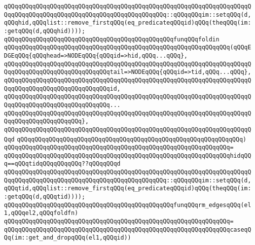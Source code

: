 \verb|qQQqqQQqqQQqqQQqqQQqqQQqqQQqqQQqqQQqqQQqqQQqqQQqqQQqqQQqqQQqqQQqqQQqqQQqqQQqqQQqqQQqqQQqqQQqqQQqqQQqqQQqqQQqqQQqqQQq::qQQqqQQqim::setqQQq(d,qQQqhid,qQQqlist::remove_firstqQQq(eq_predicateqQQqid)qQQq(theqQQq(im::getqQQq(d,qQQqhid))));|\newline
\newline
\newline
\verb|qQQqqQQqqQQqqQQqqQQqqQQqqQQqqQQqqQQqqQQqqQQqqQQqfunqQQqfoldin|\newline
\verb|qQQqqQQqqQQqqQQqqQQqqQQqqQQqqQQqqQQqqQQqqQQqqQQqqQQqqQQqqQQqqQQq(qQQqEDGEqQQq{qQQqhead=>NODEqQQq{qQQqid=>hid,qQQq...qQQq},|\newline
\verb|qQQqqQQqqQQqqQQqqQQqqQQqqQQqqQQqqQQqqQQqqQQqqQQqqQQqqQQqqQQqqQQqqQQqqQQqqQQqqQQqqQQqqQQqqQQqqQQqqQQqtail=>NODEqQQq{qQQqid=>tid,qQQq...qQQq},|\newline
\verb|qQQqqQQqqQQqqQQqqQQqqQQqqQQqqQQqqQQqqQQqqQQqqQQqqQQqqQQqqQQqqQQqqQQqqQQqqQQqqQQqqQQqqQQqqQQqqQQqqQQqid,|\newline
\verb|qQQqqQQqqQQqqQQqqQQqqQQqqQQqqQQqqQQqqQQqqQQqqQQqqQQqqQQqqQQqqQQqqQQqqQQqqQQqqQQqqQQqqQQqqQQqqQQqqQQq...|\newline
\verb|qQQqqQQqqQQqqQQqqQQqqQQqqQQqqQQqqQQqqQQqqQQqqQQqqQQqqQQqqQQqqQQqqQQqqQQqqQQqqQQqqQQqqQQqqQQq},|\newline
\verb|qQQqqQQqqQQqqQQqqQQqqQQqqQQqqQQqqQQqqQQqqQQqqQQqqQQqqQQqqQQqqQQqqQQqqQQqd|\newline
\verb|qQQqqQQqqQQqqQQqqQQqqQQqqQQqqQQqqQQqqQQqqQQqqQQqqQQqqQQqqQQqqQQq)|\newline
\verb|qQQqqQQqqQQqqQQqqQQqqQQqqQQqqQQqqQQqqQQqqQQqqQQqqQQqqQQqqQQqqQQq=|\newline
\verb|qQQqqQQqqQQqqQQqqQQqqQQqqQQqqQQqqQQqqQQqqQQqqQQqqQQqqQQqqQQqqQQqhidqQQq==qQQqtidqQQqqQQqqQQq??qQQqqQQqd|\newline
\verb|qQQqqQQqqQQqqQQqqQQqqQQqqQQqqQQqqQQqqQQqqQQqqQQqqQQqqQQqqQQqqQQqqQQqqQQqqQQqqQQqqQQqqQQqqQQqqQQqqQQqqQQqqQQqqQQqqQQq::qQQqqQQqim::setqQQq(d,qQQqtid,qQQqlist::remove_firstqQQq(eq_predicateqQQqid)qQQq(theqQQq(im::getqQQq(d,qQQqtid))));|\newline
\newline
\newline
\verb|qQQqqQQqqQQqqQQqqQQqqQQqqQQqqQQqqQQqqQQqqQQqqQQqfunqQQqrm_edgesqQQq(el1,qQQqel2,qQQqfoldfn)|\newline
\verb|qQQqqQQqqQQqqQQqqQQqqQQqqQQqqQQqqQQqqQQqqQQqqQQqqQQqqQQqqQQqqQQq=|\newline
\verb|qQQqqQQqqQQqqQQqqQQqqQQqqQQqqQQqqQQqqQQqqQQqqQQqqQQqqQQqqQQqqQQqcaseqQQq(im::get_and_dropqQQq(el1,qQQqid))|\newline
